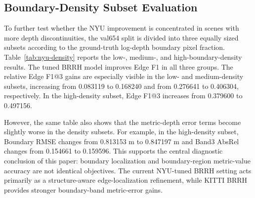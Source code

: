 \documentclass{ieeeaccess}
\begin{document}
\begin{table}[t]
\centering
\small
\caption{NYU Depth V2 sync validation on the labeled val654 split. Lower is better for AbsRel, RMSE, Boundary RMSE, and Band3 AbsRel; higher is better for $\delta_1$ and Edge F1.}
\label{tab:nyu-sync}
\end{table}

\subsection{Boundary-Density Subset Evaluation}

To further test whether the NYU improvement is concentrated in scenes with more depth discontinuities, the val654 split is divided into three equally sized subsets according to the ground-truth log-depth boundary pixel fraction. Table~\ref{tab:nyu-density} reports the low-, medium-, and high-boundary-density results. The tuned BRRH model improves Edge F1 in all three groups. The relative Edge F1@3 gains are especially visible in the low- and medium-density subsets, increasing from 0.083119 to 0.168240 and from 0.276641 to 0.406304, respectively. In the high-density subset, Edge F1@3 increases from 0.379600 to 0.497156.

However, the same table also shows that the metric-depth error terms become slightly worse in the density subsets. For example, in the high-density subset, Boundary RMSE changes from 0.813153 m to 0.847197 m and Band3 AbsRel changes from 0.154661 to 0.159596. This supports the central diagnostic conclusion of this paper: boundary localization and boundary-region metric-value accuracy are not identical objectives. The current NYU-tuned BRRH setting acts primarily as a structure-aware edge-localization refinement, while KITTI BRRH provides stronger boundary-band metric-error gains.
\end{document}
